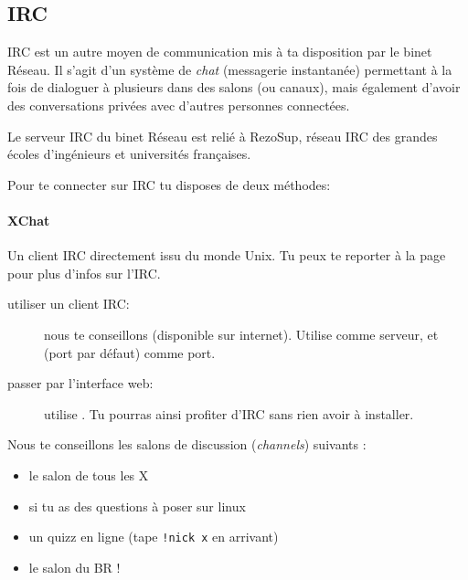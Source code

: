 
\subsection{IRC}

\label{irc}

IRC est un autre moyen de communication mis à ta disposition par le binet Réseau. Il s'agit d'un système de \emph{chat} (messagerie instantanée) permettant à la fois de dialoguer à plusieurs dans des salons (ou canaux), mais également d'avoir des conversations privées avec d'autres personnes connectées.


Le serveur IRC du binet Réseau est relié à RezoSup, réseau IRC des grandes écoles d'ingénieurs et universités françaises.

Pour te connecter sur IRC tu disposes de deux méthodes:

                  
  \paragraph{XChat}  Un client IRC directement issu du monde Unix.
                 Tu peux te reporter \`a  la page \pageref{irc} pour plus d'infos sur l'IRC.


\begin{description}
\item[utiliser un client IRC:] nous te conseillons  (disponible sur internet). Utilise   comme serveur, et  (port par défaut) comme port.
  \item[passer par l'interface web:] utilise . Tu pourras ainsi profiter d'IRC sans rien avoir à  installer.
\end{description}

 
Nous te conseillons les salons de discussion (\emph{channels}) suivants :
\begin{itemize}
  \item {} le salon de tous les X
  \item {} si tu as des questions \`a poser sur linux
  \item {} un quizz en ligne (tape \texttt{!nick x} en arrivant)
  \item {} le salon du BR !
\end{itemize}
